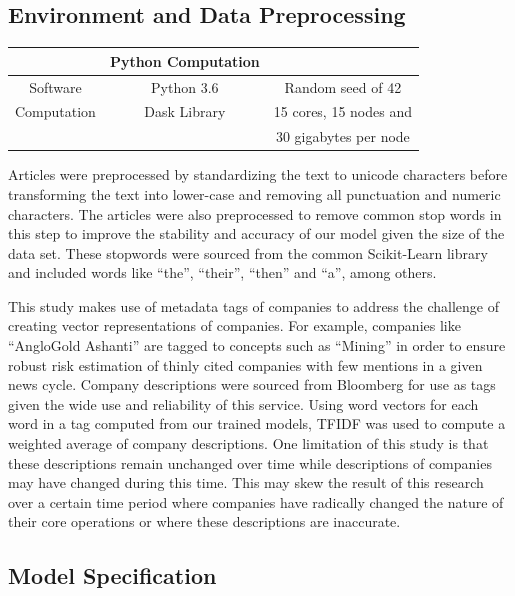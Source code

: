 \documentclass[11pt]{article}
\begin{document}
\hypertarget{environment-and-data-preprocessing}{%
\subsection{Environment and Data
Preprocessing}\label{environment-and-data-preprocessing}}

\begin{longtable}[]{@{}ccc@{}}
\toprule
& \textbf{Python Computation} &\tabularnewline
\midrule
\endhead
Software & Python 3.6 & Random seed of 42\tabularnewline
Computation & Dask Library & 15 cores, 15 nodes and\tabularnewline
& & 30 gigabytes per node\tabularnewline
\bottomrule
\end{longtable}

Articles were preprocessed by standardizing the text to unicode
characters before transforming the text into lower-case and removing all
punctuation and numeric characters. The articles were also preprocessed
to remove common stop words in this step to improve the stability and
accuracy of our model given the size of the data set. These stopwords
were sourced from the common Scikit-Learn library and included words
like ``the'', ``their'', ``then'' and ``a'', among others.

This study makes use of metadata tags of companies to address the
challenge of creating vector representations of companies. For example,
companies like ``AngloGold Ashanti'' are tagged to concepts such as
``Mining'' in order to ensure robust risk estimation of thinly cited
companies with few mentions in a given news cycle. Company descriptions
were sourced from Bloomberg for use as tags given the wide use and
reliability of this service. Using word vectors for each word in a tag
computed from our trained models, TFIDF was used to compute a weighted
average of company descriptions. One limitation of this study is that
these descriptions remain unchanged over time while descriptions of
companies may have changed during this time. This may skew the result of
this research over a certain time period where companies have radically
changed the nature of their core operations or where these descriptions
are inaccurate.

\hypertarget{model-specification}{%
\subsection{Model Specification}\label{model-specification}}
\end{document}
